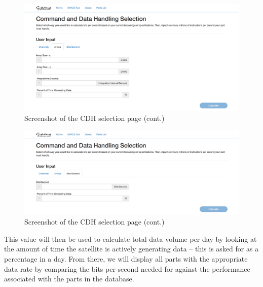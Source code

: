 \documentclass[a4, 12 pt]{article} %
\begin{document}
\begin{figure}[H]
\begin{center}
\includegraphics[width=\linewidth]{6b}
\caption{Screenshot of the CDH selection page (cont.)}
\label{default}
\end{center}
\end{figure}\begin{figure}[H]
\begin{center}
\includegraphics[width=\linewidth]{6c}
\caption{Screenshot of the CDH selection page (cont.)}
\label{default}
\end{center}
\end{figure}
This value will then be used to calculate total data volume per day by looking at the amount of time the satellite is actively generating data -- this is asked for as a percentage in a day. From there, we will display all parts with the appropriate data rate by comparing the bits per second needed for against the performance associated with the parts in the database. 
\end{document}
